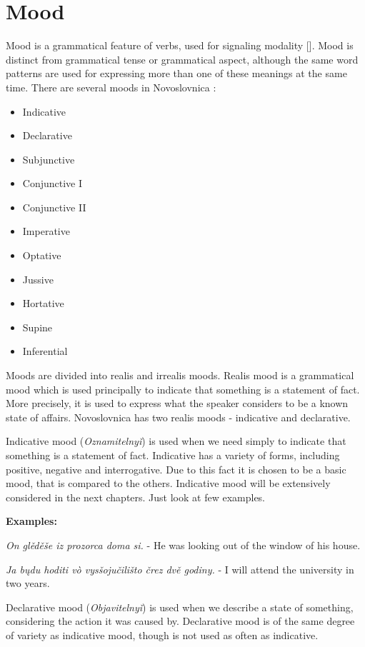 \section{Mood}


Mood is a grammatical feature of verbs, used for signaling modality []. Mood is distinct from grammatical tense or grammatical aspect, although the same word patterns are used for expressing more than one of these meanings at the same time. There are several moods in Novoslovnica \cite{nsl-naklony}:

\begin{itemize}
	\item Indicative
	\item Declarative
	\item Subjunctive
	\item Conjunctive I
	\item Conjunctive II
	\item Imperative
	\item Optative
	\item Jussive
	\item Hortative
	\item Supine
	\item Inferential
\end{itemize}

Moods are divided into realis and irrealis moods. Realis mood is a grammatical mood which is used principally to indicate that something is a statement of fact. More precisely, it is used to express what the speaker considers to be a known state of affairs. Novoslovnica has two realis moods - indicative and declarative.

Indicative mood (\textit{Oznamitelnyǐ})  is used when we need simply to indicate that something is a statement of fact. Indicative has a variety of forms, including positive, negative and interrogative. Due to this fact it is chosen to be a basic mood, that is compared to the others. Indicative mood will be extensively considered in the next chapters. Just look at few examples.

\textbf{Examples:}

\textit{On glěděše iz prozorca doma si.} - He was looking out of the window of his house.

\textit{Ja bųdu hoditi vò vysšojučilišto črez dvě godiny.} - I will attend the university in two years.

Declarative mood (\textit{Objavitelnyǐ}) is used when we describe a state of something, considering the action it was caused by. Declarative mood is of the same degree of variety as indicative mood, though is not used as often as indicative.

